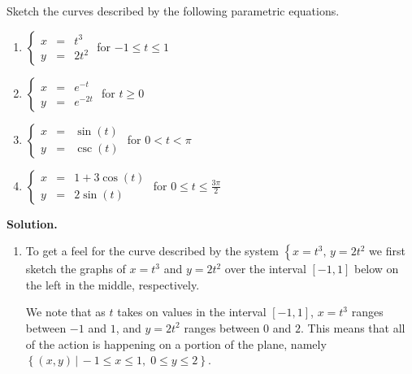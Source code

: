\begin{ex} \label{parametrictorect}  Sketch the curves described by the following parametric equations.  

\begin{multicols}{2}

\begin{enumerate}

\item  $\left\{ \begin{array}{rcl} x & = & t^3 \\ y & = & 2t^2 \end{array} \right.$ for $-1 \leq t \leq 1$
\item  $\left\{ \begin{array}{rcl} x & = & e^{-t} \\ y & = & e^{-2t} \end{array} \right.$ for $t \geq 0$
\item \label{parametric1overx} $\left\{ \begin{array}{rcl} x & = & \sin(t) \\ y & = & \csc(t) \end{array} \right.$ for $0 < t < \pi$
\item  \label{parametricellipse} $\left\{ \begin{array}{rcl} x & = & 1 + 3\cos(t) \\ y & = & 2\sin(t) \end{array} \right.$ for $0 \leq t \leq \frac{3\pi}{2}$
  

\end{enumerate}

\end{multicols}

{\bf Solution.}

\begin{enumerate}

\item  To get a feel for the curve described by the system $\left\{ x = t^3, \, y = 2t^2 \right.$ we first sketch the graphs of $x = t^3$ and $y =  2t^2$ over the interval $[-1,1]$ below on the left in the middle, respectively.

\smallskip

We note that as $t$ takes on values in the interval $[-1,1]$, $x = t^3$ ranges between $-1$ and $1$, and $y =  2t^2$ ranges between $0$ and $2$.    This means that all of the action is happening on a portion of the plane, namely $\left\{ (x,y) \, | \, -1 \leq x \leq 1, \; 0 \leq y \leq 2 \right\}$.  


\end{enumerate}
\end{ex}
